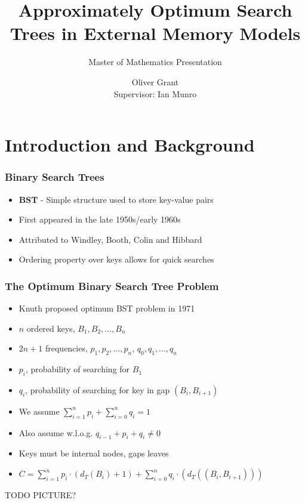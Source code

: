 \documentclass{beamer}
\title{Approximately Optimum Search
Trees in External Memory Models}
\subtitle{Master of Mathematics Presentation}
\author{Oliver Grant \\
Supervisor: Ian Munro}
\theoremstyle{plain}
\begin{document}
 \date{}
\begin{frame}
  \titlepage
\end{frame}


\section{Introduction and Background}

\begin{frame} \frametitle{Binary Search Trees}

\begin{itemize}

\item \textbf{BST} - Simple structure used to store key-value pairs

\item First appeared in the late 1950s/early 1960s

\item Attributed to Windley, Booth, Colin and Hibbard \cite{windley1960trees, booth1960efficiency, hibbard1962some}

\item Ordering property over keys allows for quick searches

\end{itemize}

\end{frame}

\begin{frame} \frametitle{The Optimum Binary Search Tree Problem}

\begin{itemize}

\item Knuth proposed optimum BST problem in 1971 \cite{knuth1971optimum}

\item $n$ ordered keys, $B_1, B_2, ..., B_n$

\item $2n+1$ frequencies, ${p_1, p_2, ..., p_n}$, ${q_0, q_1, ..., q_n}$

\item $p_i$, probability of searching for $B_1$

\item $q_i$, probability of searching for key in gap $(B_i, B_{i+1})$

\item We assume $\sum\limits_{i=1}^n p_i + \sum\limits_{i=0}^n q_i = 1$

\item Also assume w.l.o.g. $q_{i-1}+p_i+q_i \neq 0$

\item Keys must be internal nodes, gaps leaves

\item $C = \sum_{i=1}^{n} p_i \cdot (d_T(B_i)+1) + \sum_{i=0}^{n} q_i \cdot(d_T((B_i, B_{i+1})))$


\end{itemize}
TODO PICTURE?
\end{frame}
\end{document}
